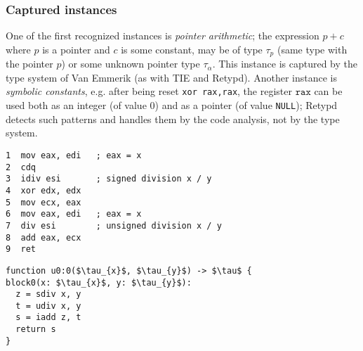 \documentclass[compsoc,conference,a4paper,10pt,times]{IEEEtran}
\begin{document}
\subsubsection*{Captured instances} 
One of the first recognized instances is \emph{pointer arithmetic}; 
the expression $p + c$ where $p$ is a pointer and $c$ is some constant, may be of type $\tau_{p}$ (same type with the pointer
$p$) or some unknown pointer type $\tau_{\alpha}$. This instance is captured by the type system
of Van Emmerik (as with TIE and Retypd). Another instance is \emph{symbolic constants}, e.g. after being reset
\texttt{\small xor rax,rax},
the register $\mathtt{rax}$ can be used both as an integer (of value $0$) and as a pointer
(of value \texttt{NULL}); Retypd detects such patterns and handles them by the code analysis, not by
the type system.

\begin{lstlisting}[language={[x86masm]Assembler},caption={Signed and unsigned division},label={lst:divisionasm}]
1  mov eax, edi   ; eax = x
2  cdq
3  idiv esi       ; signed division x / y
4  xor edx, edx
5  mov ecx, eax
6  mov eax, edi   ; eax = x
7  div esi        ; unsigned division x / y
8  add eax, ecx
9  ret
\end{lstlisting}
\begin{lstlisting}[style={cranelift},mathescape=true,caption={Signed and unsigned division (cranelift)},label={lst:divisionclift}]
function u0:0($\tau_{x}$, $\tau_{y}$) -> $\tau$ {
block0(x: $\tau_{x}$, y: $\tau_{y}$):
  z = sdiv x, y
  t = udiv x, y 
  s = iadd z, t
  return s
}
\end{lstlisting}
\end{document}

